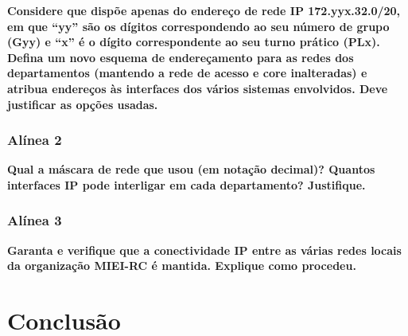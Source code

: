 \documentclass[a4paper]{report}
\begin{document}
\textbf{Considere que dispõe apenas do endereço de rede IP 172.yyx.32.0/20, em que “yy”
são os dígitos correspondendo ao seu número de grupo (Gyy) e “x” é o dígito 
correspondente ao seu turno prático (PLx). Defina um novo esquema de endereçamento para 
as redes dos departamentos (mantendo a rede de acesso e core inalteradas) e atribua 
endereços às interfaces dos vários sistemas envolvidos. Deve justificar as opções usadas.}

\subsection{Alínea 2}
\textbf{Qual a máscara de rede que usou (em notação decimal)? Quantos interfaces IP pode 
interligar em cada departamento? Justifique.}

\subsection{Alínea 3}
\textbf{Garanta e verifique que a conectividade IP entre as várias redes locais da 
organização MIEI-RC é mantida. Explique como procedeu.}

\chapter{Conclusão}
\end{document}

